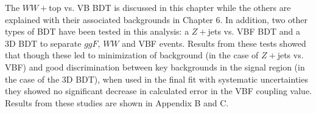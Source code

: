 The $WW+$top vs. VB BDT is discussed in this chapter while the others are explained with their associated backgrounds in Chapter 6. In addition, two other types of BDT have been tested in this analysis: a $Z+$jets vs. VBF BDT and a 3D BDT to separate $ggF$, $WW$ and VBF events. Results from these tests showed that though these led to minimization of background (in the case of $Z+$jets vs. VBF) and good discrimination between key backgrounds in the signal region (in the case of the 3D BDT), when used in the final fit with systematic uncertainties they showed no significant decrease in calculated error in the VBF coupling value. Results from these studies are shown in Appendix B and C.
\begin{table}[h!]
\centering
{}
\caption{Each background and its relative size of in SR (after all cuts), estimation method, and generator.}
\label{tab:bkgsum}
\end{table}

